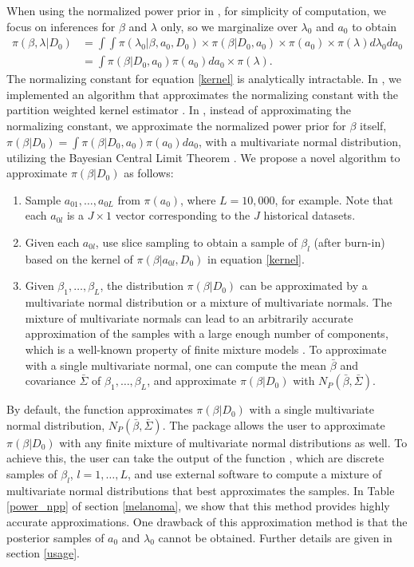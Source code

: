  When using the normalized power prior in , for simplicity of computation, we focus on inferences for $\beta$ and $\lambda$ only, so we marginalize over $\lambda_0$ and $a_0$ to obtain 
\begin{align*}
\pi(\beta,\lambda|D_0) &= \int\int\pi(\lambda_0|\beta,a_0,D_0) \times \pi(\beta|D_0, a_0) \times \pi(a_0) \times \pi(\lambda)d\lambda_0da_0\\
&=\int\pi(\beta|D_0, a_0)\pi(a_0)da_0 \times \pi(\lambda).
\end{align*}
The normalizing constant for equation \eqref{kernel} is analytically intractable. In , we implemented an algorithm \citep{shen_RJ} that approximates the normalizing constant with the partition weighted kernel estimator \citep{pwk_2018}. In , instead of approximating the normalizing constant, we approximate the normalized power prior for $\beta$ itself, $\pi(\beta|D_0)=\int\pi(\beta|D_0, a_0)\pi(a_0)da_0$, with a multivariate normal distribution, utilizing the Bayesian Central Limit Theorem \citep{chen_1985}. We propose a novel algorithm to approximate $\pi(\beta|D_0)$ as follows: 
\begin{enumerate}
\item  Sample $a_{01}, \dots, a_{0L}$ from $\pi(a_0)$, where $L=10,000$, for example. Note that each $a_{0l}$ is a $J \times 1$ vector corresponding to the $J$ historical datasets. 
\item Given each $a_{0l}$, use slice sampling \citep{slice} to obtain a sample of $\beta_l$ (after burn-in) based on the kernel of $\pi(\beta|a_{0l}, D_0)$ in equation \eqref{kernel}.
\item Given $\beta_1, \dots, \beta_L$, the distribution $\pi(\beta|D_0)$ can be approximated by a multivariate normal distribution or a mixture of multivariate normals. The mixture of multivariate normals can lead to an arbitrarily accurate approximation of the samples with a large enough number of components, which is a well-known property of finite mixture models \citep{titterington_1985, Nguyen_2020}. To approximate with a single multivariate normal, one can compute the mean $\bar{\beta}$ and covariance $\bar{\Sigma}$ of $\beta_1, \dots, \beta_L$, and approximate $\pi(\beta|D_0)$ with $N_P(\bar{\beta}, \bar{\Sigma})$. 
\end{enumerate}
By default, the function  approximates $\pi(\beta|D_0)$ with a single multivariate normal distribution, $N_P(\bar{\beta}, \bar{\Sigma})$. The package allows the user to approximate $\pi(\beta|D_0)$ with any finite mixture of multivariate normal distributions as well. To achieve this, the user can take the output of the function , which are discrete samples of $\beta_l$, $l=1,\dots,L$, and use external software to compute a mixture of multivariate normal distributions that best approximates the samples. In Table \ref{power_npp} of section \ref{melanoma}, we show that this method provides highly accurate approximations. One drawback of this approximation method is that the posterior samples of $a_0$ and $\lambda_0$ cannot be obtained. Further details are given in section \ref{usage}. 


